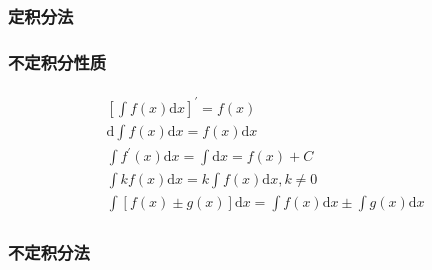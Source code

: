 \documentclass[12pt]{book}
\begin{document}
\subsubsection{定积分法}







\subsubsection{不定积分性质}



\begin{gather*}
    \begin{aligned}
        & [\int f(x) \mathrm{d}x]^\prime = f(x)  \\
        & \mathrm{d} \int f(x) \mathrm{d}x = f(x) \mathrm{d}x \\
        & \int{ f^\prime(x) \mathrm{d}x } = \int{\mathrm{d}x} = f(x) +C \\
        & \int{ kf(x) \mathrm{d}x} = k \int{f(x)\mathrm{d}x}, k\neq 0 \\
        & \int{[f(x)\pm g(x)] \mathrm{d}x} = \int{f(x)\mathrm{d}x}\pm\int{g(x)\mathrm{d}x} 
    \end{aligned}
\end{gather*}



\subsubsection{不定积分法}
\end{document}
